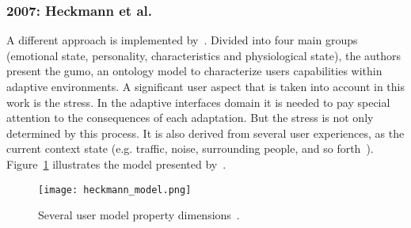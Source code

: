 
\subsubsection{2007: Heckmann et al.}
\label{sec:heckmann}

A different approach is implemented by~\citet{heckmann_gumogeneral_2005}.
Divided into four main groups (emotional state, personality, characteristics and
physiological state), the authors present the \acf{gumo}, an ontology model to 
characterize users capabilities within adaptive environments. A significant 
user aspect that is taken into account in this work is the stress. In the 
adaptive interfaces domain it is needed to pay special attention to the 
consequences of each adaptation. But the stress is not only determined  by this 
process. It is also derived from several user experiences, as the current 
context state (e.g. traffic, noise, surrounding people, and so 
forth~\citep{babisch_noise_stress_2002}). Figure~\ref{fig:heckmann_model} illustrates
the model presented by~\citeauthor{heckmann_gumogeneral_2005}.


\begin{figure}
\centering
\texttt{[image: heckmann\_model.png]}
\caption{Several user model property
dimensions~\citep{heckmann_gumogeneral_2005}.}
\label{fig:heckmann_model}
\end{figure}

